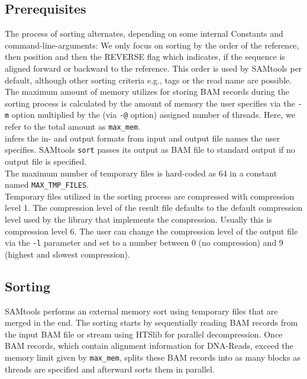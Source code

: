 \subsection{Prerequisites}
The process of sorting alternates, depending on some internal Constants and command-line-arguments: 
We only focus on sorting by the order of the reference, then position and then the REVERSE flag which indicates, if the sequence is aligned forward or backward to the reference. This order is used by SAMtools per default, although other sorting criteria e.g., tags or the read name are possible.\\

The maximum amount of memory \sort utilizes for storing BAM records during the sorting process is calculated by the amount of memory the user specifies via the \texttt{-m} option multiplied by the (via \texttt{-@} option) assigned number of threads. Here, we refer to the total amount as \texttt{max\_mem}. \\

\sort infers the in- and output formats from input and output file names the user specifies. SAMtools \texttt{sort} passes its output as BAM file to standard output if no output file is specified.\\

The maximum number of temporary files is hard-coded as 64 in a constant named \texttt{MAX\_TMP\_FILES}. \\

Temporary files utilized in the sorting process are compressed with compression level 1. The compression level of the result file defaults to the default compression level used by the library that implements the compression. Usually this is compression level 6. The user can change the compression level of the output file via the \texttt{-l} parameter and set to a number between 0 (no compression) and 9 (highest and slowest compression).

\subsection{Sorting} \label{sorting}

SAMtools performs an external memory sort using temporary files that are merged in the end.
The sorting starts by sequentially reading BAM records from the input BAM file or stream using HTSlib for parallel decompression. Once BAM records, which contain alignment information for DNA-Reads, exceed the memory limit given by \texttt{max\_mem}, \sort splits these BAM records into as many blocks as threads are specified and afterward sorts them in parallel. \\

